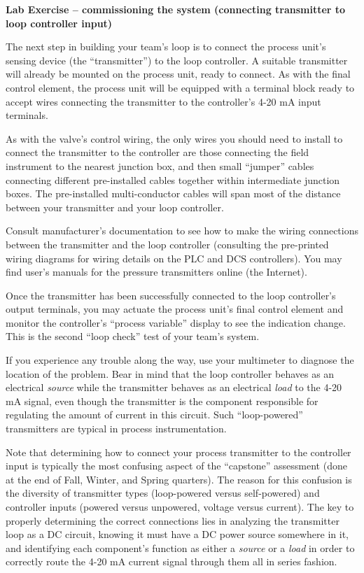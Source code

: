 \noindent
{\bf Lab Exercise -- commissioning the system (connecting transmitter to loop controller input)}

\vskip 5pt

The next step in building your team's loop is to connect the process unit's sensing device (the ``transmitter'') to the loop controller.  A suitable transmitter will already be mounted on the process unit, ready to connect.  As with the final control element, the process unit will be equipped with a terminal block ready to accept wires connecting the transmitter to the controller's 4-20 mA input terminals.

As with the valve's control wiring, the only wires you should need to install to connect the transmitter to the controller are those connecting the field instrument to the nearest junction box, and then small ``jumper'' cables connecting different pre-installed cables together within intermediate junction boxes.  The pre-installed multi-conductor cables will span most of the distance between your transmitter and your loop controller.

Consult manufacturer's documentation to see how to make the wiring connections between the transmitter and the loop controller (consulting the pre-printed wiring diagrams for wiring details on the PLC and DCS controllers).  You may find user's manuals for the pressure transmitters online (the Internet).

\vskip 10pt

Once the transmitter has been successfully connected to the loop controller's output terminals, you may actuate the process unit's final control element and monitor the controller's ``process variable'' display to see the indication change.  This is the second ``loop check'' test of your team's system.

\vskip 10pt

If you experience any trouble along the way, use your multimeter to diagnose the location of the problem.  Bear in mind that the loop controller behaves as an electrical {\it source} while the transmitter behaves as an electrical {\it load} to the 4-20 mA signal, even though the transmitter is the component responsible for regulating the amount of current in this circuit.  Such ``loop-powered'' transmitters are typical in process instrumentation.

\vskip 10pt

Note that determining how to connect your process transmitter to the controller input is typically the most confusing aspect of the ``capstone'' assessment (done at the end of Fall, Winter, and Spring quarters).  The reason for this confusion is the diversity of transmitter types (loop-powered versus self-powered) and controller inputs (powered versus unpowered, voltage versus current).  The key to properly determining the correct connections lies in analyzing the transmitter loop as a DC circuit, knowing it must have a DC power source somewhere in it, and identifying each component's function as either a {\it source} or a {\it load} in order to correctly route the 4-20 mA current signal through them all in series fashion.








